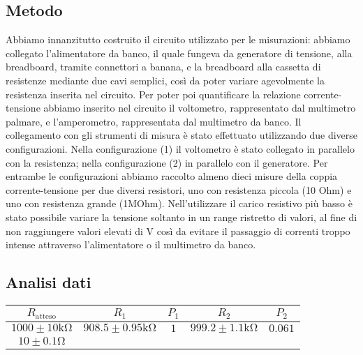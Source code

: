 \documentclass[a4paper]{article}
\begin{document}
\subsection{Metodo}
Abbiamo innanzitutto costruito il circuito utilizzato per le misurazioni: abbiamo collegato l'alimentatore da banco, il quale fungeva da generatore di tensione, alla breadboard, tramite connettori a banana,
e la breadboard alla cassetta di resistenze mediante due cavi semplici, così da poter variare agevolmente la resistenza inserita nel circuito.
Per poter poi quantificare la relazione corrente-tensione abbiamo inserito nel circuito il voltometro, rappresentato dal multimetro palmare, e l'amperometro, rappresentata dal multimetro da banco.
Il collegamento con gli strumenti di misura è stato effettuato utilizzando due diverse configurazioni. Nella configurazione (1) il voltometro è stato collegato in parallelo con la resistenza;
nella configurazione (2) in parallelo con il generatore. 
Per entrambe le configurazioni abbiamo raccolto almeno dieci misure della coppia corrente-tensione per due diversi resistori, uno con resistenza piccola (10 Ohm) e uno con resistenza grande (1MOhm).
Nell'utilizzare il carico resistivo più basso è stato possibile variare la tensione soltanto in un range ristretto di valori, 
al fine di non raggiungere valori elevati di V così da evitare il passaggio di correnti troppo intense attraverso l'alimentatore o il multimetro da banco.
\subsection{Analisi dati}



\centering
\begin{tabular}{|c|c|c|c|c|}
	\hline
	$R_{\text{atteso}}$            & $R_1$                           & $P_1$ & $R_2$ & $P_2$ \\
	\hline
	$1000 \pm 10 \si{\kilo\ohm}$   & $908.5 \pm 0.95 \si{\kilo\ohm}$ & $1$   &
	$999.2 \pm 1.1 \si{\kilo\ohm}$ & $0.061$                                                 \\
    \hline
	$10 \pm 0.1 \si{\ohm}$          &                                 &       &       &       \\
	\hline
\end{tabular}
\label{tab:Verfica legge di Ohm}






\subsection{}
\end{document}
